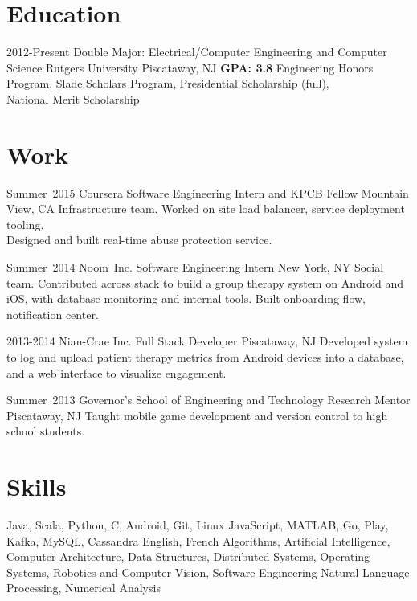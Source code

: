 \documentclass[11pt,letterpaper]{moderncv}
\begin{document}
\maketitle

\section{Education}
\cventry
    {2012-Present}
    {Double Major: Electrical/Computer Engineering and Computer Science}
    {\break Rutgers University}
    {Piscataway, NJ}
    {\textbf{GPA: 3.8}}
    {Engineering Honors Program, Slade Scholars Program, Presidential Scholarship (full),\\National Merit Scholarship}

\section{Work}
    \cventry
        {Summer~2015}
        {Coursera}
        {Software Engineering Intern and KPCB Fellow}
        {Mountain View, CA}
        {}
        {Infrastructure team. Worked on site load balancer, service deployment tooling. \\Designed and built real-time abuse protection service. \\}

    \cventry
        {Summer~2014}
        {Noom~Inc.}
        {Software Engineering Intern}
        {New York, NY}
        {}
        {Social team. Contributed across stack to build a group therapy system on Android and iOS, with database monitoring and internal tools. Built onboarding flow, notification center.\\}

    \cventry
        {2013-2014}
        {Nian-Crae Inc.}
        {Full Stack Developer}
        {Piscataway, NJ}
        {}
        {Developed system to log and upload patient therapy metrics from Android devices into a database,\\and a web interface to visualize engagement.\\}

    \cventry
        {Summer~2013}
        {Governor's School of Engineering and Technology}
        {Research Mentor}
        {Piscataway, NJ}
        {}
        {Taught mobile game development and version control to high school students.}

\section{Skills}
       {Java, Scala, Python, C, Android, Git, Linux}
       {JavaScript, MATLAB, Go, Play, Kafka, MySQL, Cassandra}
       {English, French}
       {Algorithms, Artificial Intelligence, Computer Architecture, Data Structures, Distributed Systems, Operating Systems, Robotics and Computer Vision, Software Engineering}
       {Natural Language Processing, Numerical Analysis}
\end{document}
